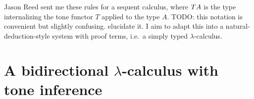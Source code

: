 \documentclass{rntz}
\newcommand{\todo}[1]{{\color{Purple}#1}}
\newcommand{\mb}[1]{\ensuremath{\mathbf{#1}}}
\begin{document}
Jason Reed sent me these rules for a sequent calculus, where $T A$ is the
type internalizing the tone functor $T$ applied to the type $A$. \todo{TODO:
  this notation is convenient but slightly confusing. elucidate it.} I aim to
adapt this into a natural-deduction-style system with proof terms, i.e.\ a
simply typed $\lambda$-calculus.


\section{A bidirectional \texorpdfstring{$\lambda$}{lambda}-calculus with tone inference}

\newcommand{\tpcolor}{}%
\newcommand{\tmcolor}{}%
\newcommand{\cxcolor}{}%

\newcommand{\subtype}{\le}
\newcommand{\strips}{\prec}

\newcommand{\uh}[2]{#1 : #2}            %
\newcommand{\h}[3]{\uh{#1}{\mtp{#2}{#3}}}
\newcommand{\infers}[3]{{\tmcolor#1} \Rightarrow {\cxcolor#2} \vdash {\tpcolor#3}}
\newcommand{\checks}[3]{{\tmcolor#1} \Leftarrow {\cxcolor#2} \vdash {\tpcolor#3}}

\newcommand{\ein}[2]{\textsf{in}_{#1}\:{#2}}
\newcommand{\cto}{\shortrightarrow}
\newcommand{\ecase}[1]{\mb{case}~{#1}~\mb{of}~\,}
\newcommand{\emptycx}{\varepsilon}

\newcommand{\mdist}[2]{#1 \equiv #2}
\newcommand{\mbinop}{\oast}
\newcommand{\adjoint}[2]{#1 \dashv #2}


\end{document}
